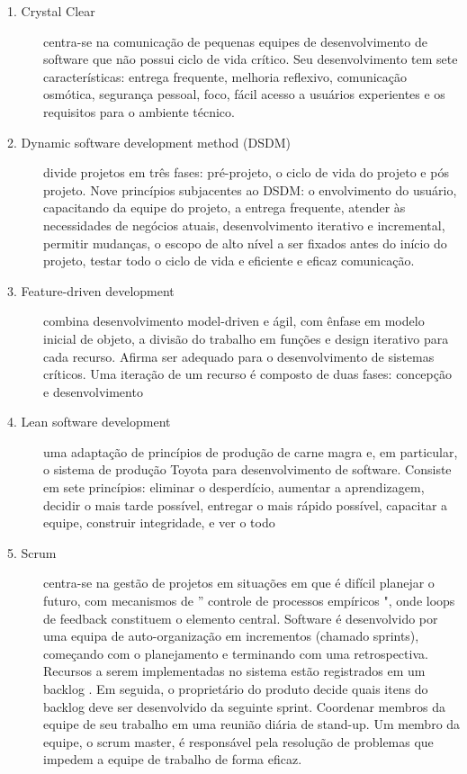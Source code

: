 \begin{description}

\item [1. Crystal Clear]
%
centra-se na comunicação de pequenas equipes de
desenvolvimento de software que não possui ciclo de vida crítico.
%
Seu desenvolvimento tem sete características: entrega frequente,
melhoria reflexivo, comunicação osmótica, segurança pessoal, foco,
fácil acesso a usuários experientes e os requisitos para o ambiente técnico.

\item [2. Dynamic software development method (DSDM)]
%
divide projetos em três fases: pré-projeto, o ciclo de vida do projeto  e pós projeto. Nove princípios subjacentes ao DSDM: o envolvimento do usuário, capacitando da equipe do projeto,  a entrega frequente, atender às necessidades de negócios atuais,  desenvolvimento iterativo e incremental, permitir mudanças,  o escopo de alto nível a ser fixados antes do início do projeto,  testar todo o ciclo de vida e eficiente e eficaz comunicação.
            
\item [3. Feature-driven development]
%
combina desenvolvimento model-driven e ágil, com ênfase  em modelo inicial de objeto, a divisão do trabalho em funções  e design iterativo para cada recurso. Afirma ser adequado para  o desenvolvimento de sistemas críticos. Uma iteração de um  recurso é composto de duas fases: concepção e desenvolvimento
       
\item [4. Lean software development]
%
uma adaptação de princípios de produção de carne magra e,  em particular, o sistema de produção Toyota para desenvolvimento  de software. Consiste em sete princípios: eliminar o desperdício,  aumentar a aprendizagem, decidir o mais tarde possível,  entregar o mais rápido possível, capacitar a equipe,  construir integridade, e ver o todo
                    
\item [5. Scrum]
%
centra-se na gestão de projetos em situações em que é difícil  planejar o futuro, com mecanismos de '' controle de processos  empíricos ", onde loops de feedback constituem o elemento central.  Software é desenvolvido por uma equipa de auto-organização  em incrementos (chamado sprints), começando com o planejamento  e terminando com uma retrospectiva. Recursos a serem implementadas  no sistema estão registrados em um backlog . Em seguida,  o proprietário do produto decide quais itens do backlog deve ser  desenvolvido da seguinte sprint. Coordenar membros da equipe  de seu trabalho em uma reunião diária de stand-up. Um membro  da equipe, o scrum master, é responsável pela resolução de  problemas que impedem a equipe de trabalho de forma eficaz.
 

\end{description}

